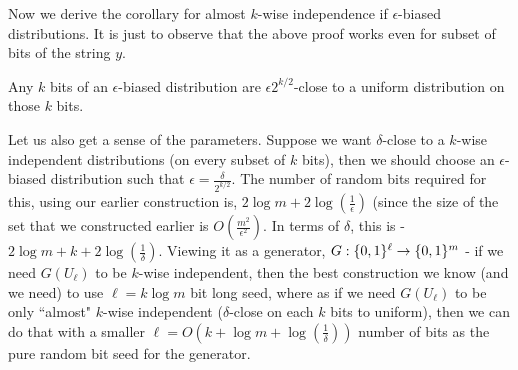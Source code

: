Now we derive the corollary for almost $k$-wise independence if $\epsilon$-biased distributions. It is just to observe that the above proof works even for subset of bits of the string $y$.

\begin{corollary}
Any $k$ bits of an $\epsilon$-biased distribution are $\epsilon 2^{k/2}$-close to a uniform distribution on those $k$ bits.
\end{corollary}

Let us also get a sense of the parameters. Suppose we want $\delta$-close to a $k$-wise independent distributions (on every subset of $k$ bits), then we should choose an $\epsilon$-biased distribution such that $\epsilon = \frac{\delta}{2^{k/2}}$. The number of random bits required for this, using our earlier construction is, $2 \log m + 2 \log \left( \frac{1}{\epsilon} \right)$ (since the size of the set that we constructed earlier is $O\left( \frac{m^2}{\epsilon^2} \right)$.
In terms of $\delta$, this is - $2 \log m + k + 2 \log\left(\frac{1}{\delta} \right)$. Viewing it as a generator, $G : \{0,1\}^\ell \to \{0,1\}^m$ - if we need $G(U_\ell)$ to be $k$-wise independent, then the best construction we know (and we need) to use $\ell = k \log m$ bit long seed, where as if we need $G(U_\ell)$ to be only ``almost" $k$-wise independent ($\delta$-close on each $k$ bits to uniform), then we can do that with a smaller $\ell = O\left( k+\log m+\log\left( \frac{1}{\delta} \right)\right)$ number of bits as the pure random bit seed for the generator.